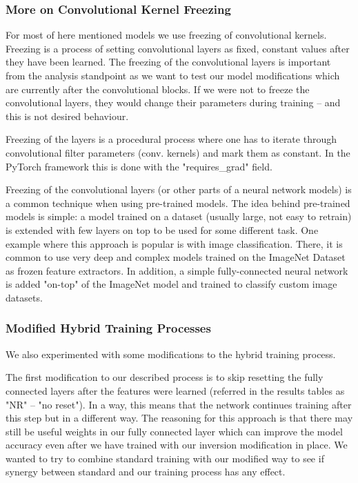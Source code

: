 \documentclass[b5paper]{book}
\begin{document}
\subsubsection{More on Convolutional Kernel Freezing}

For most of here mentioned models we use freezing of convolutional kernels. Freezing is a process of setting convolutional layers as fixed, constant values after they have been learned. The freezing of the convolutional layers is important from the analysis standpoint as we want to test our model modifications which are currently after the convolutional blocks. If we were not to freeze the convolutional layers, they would change their parameters during training -- and this is not desired behaviour. 

Freezing of the layers is a procedural process where one has to iterate through convolutional filter parameters (conv. kernels) and mark them as constant. In the PyTorch framework this is done with the "requires\_grad" field.

Freezing of the convolutional layers (or other parts of a neural network models) is a common technique when using pre-trained models. The idea behind pre-trained models is simple: a model trained on a dataset (usually large, not easy to retrain) is extended with few layers on top to be used for some different task. One example where this approach is popular is with image classification. There, it is common to use very deep and complex models trained on the ImageNet Dataset as frozen feature extractors. In addition, a simple fully-connected neural network is added "on-top" of the ImageNet model and trained to classify custom image datasets.

\subsubsection{Modified Hybrid Training Processes}

We also experimented with some modifications to the hybrid training process.

The first modification to our described process is to skip resetting the fully connected layers after the features were learned (referred in the results tables as "NR" -- "no reset").  In a way, this means that the network continues training after this step but in a different way. The reasoning for this approach is that there may still be useful weights in our fully connected layer which can improve the model accuracy even after we have trained with our inversion modification in place. We wanted to try to combine standard training with our modified way to see if synergy between standard and our training process has any effect.
\end{document}
